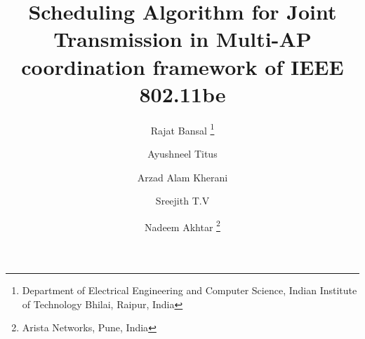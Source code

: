 \def\st#1{{\color{red} #1 }}
\def\rep#1{{\color{blue} #1 }}
\renewcommand{\H}{\textbf{H}}
\newcommand{\Q}{\textbf{Q}}
\newcommand{\y}{\textbf{y}}
\newcommand{\x}{\textbf{x}}
\newcommand{\No}{\textbf{n}}
\newcommand{\W}{\textbf{W}}
\newcommand{\Lb}{\textbf{L}}
\newcommand{\I}{\textbf{I}}
\newcommand{\ie}{\textit{i.e.}}
\newcommand{\sinr}{\text{SINR}}
\newcommand{\ber}{\text{BER}}
\newcommand{\snr}{\text{SNR}}
\newcommand{\one}{1}
\newtheorem{thm}{Theorem}
\newtheorem{cor}[thm]{Corollary}
\def\d{\mathrm{d}}
%
%
%
%





\title{%
Scheduling Algorithm for Joint Transmission in Multi-AP coordination framework of IEEE 802.11be 
}



\author{
    Rajat Bansal \thanks{Department of Electrical Engineering and Computer Science, Indian Institute of Technology Bhilai, Raipur, India}  \and
    Ayushneel Titus \footnotemark[1]      \and
    Arzad Alam Kherani \footnotemark[1]   \and
    Sreejith T.V \footnotemark[1]     \and
    Nadeem Akhtar \thanks{Arista Networks, Pune, India}
}


